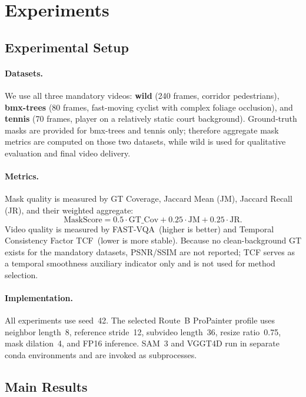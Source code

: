 \section{Experiments}
\label{sec:exp}

\subsection{Experimental Setup}

\paragraph{Datasets.}
We use all three mandatory videos: \textbf{wild} (240 frames, corridor pedestrians),
\textbf{bmx-trees} (80 frames, fast-moving cyclist with complex foliage occlusion), and
\textbf{tennis} (70 frames, player on a relatively static court background).
Ground-truth masks are provided for bmx-trees and tennis only; therefore aggregate mask
metrics are computed on those two datasets, while wild is used for qualitative evaluation
and final video delivery.

\paragraph{Metrics.}
Mask quality is measured by GT Coverage, Jaccard Mean (JM), Jaccard Recall (JR), and
their weighted aggregate:
\begin{equation}
  \text{MaskScore} = 0.5 \cdot \text{GT\_Cov} + 0.25 \cdot \text{JM} + 0.25 \cdot \text{JR}.
  \label{eq:maskscore}
\end{equation}
Video quality is measured by FAST-VQA~(higher is better) and Temporal Consistency
Factor TCF~(lower is more stable). Because no clean-background GT exists for the
mandatory datasets, PSNR/SSIM are not reported; TCF serves as a temporal smoothness
auxiliary indicator only and is not used for method selection.

\paragraph{Implementation.}
All experiments use seed~42. The selected Route~B ProPainter profile uses neighbor
length~8, reference stride~12, subvideo length~36, resize ratio~0.75, mask dilation~4,
and FP16 inference. SAM~3 and VGGT4D run in separate conda environments and are invoked
as subprocesses.

\subsection{Main Results}
\label{sec:exp:main}

